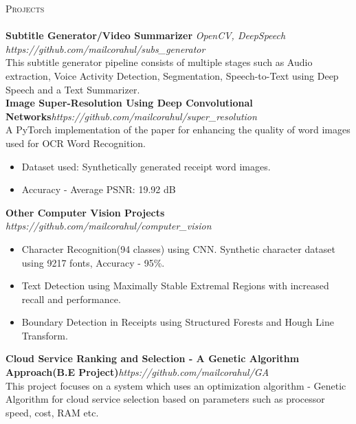 \documentclass[a4paper]{article}
\newcommand{\lineunder} {
    \vspace*{-8pt} \\
    \hspace*{-18pt} \hrulefill \\
}
\newcommand{\header} [1] {
    {\hspace*{-18pt}\vspace*{6pt} \textsc{#1}}
    \vspace*{-6pt} \lineunder
}
\begin{document}
\header{Projects}
{\textbf{Subtitle Generator/Video Summarizer}} {\sl OpenCV, DeepSpeech} \hfill \textit{https://github.com/mailcorahul/subs\_generator}\\
This subtitle generator pipeline consists of multiple stages such as Audio extraction, Voice Activity Detection, Segmentation, Speech-to-Text using Deep Speech and a Text Summarizer.\\
\vspace*{2mm}
{\textbf{Image Super-Resolution Using Deep Convolutional Networks}}\hfill \textit{https://github.com/mailcorahul/super\_resolution}\\
A PyTorch implementation of the paper for enhancing the quality of word images used for OCR Word Recognition.\\
    \begin{itemize}
        \itemsep-0.5em
        \item Dataset used: Synthetically generated receipt word images.
        \item Accuracy - Average PSNR: 19.92 dB
    \end{itemize}

\vspace*{2mm}
{\textbf{Other Computer Vision Projects}} \\ \textit{https://github.com/mailcorahul/computer\_vision}\\

    \begin{itemize}
        \itemsep-0.5em
        \item Character Recognition(94 classes) using CNN. Synthetic character dataset using 9217 fonts, Accuracy - 95\%.
        \item Text Detection using Maximally Stable Extremal Regions with increased recall and performance.
        \item Boundary Detection in Receipts using Structured Forests and Hough Line Transform.\\
    \end{itemize}
\vspace*{2mm}
{\textbf{Cloud Service Ranking and Selection - A Genetic Algorithm Approach(B.E Project)}}\hfill \textit{https://github.com/mailcorahul/GA}\\
This project focuses on a system which uses an optimization algorithm - Genetic Algorithm for cloud service selection based on parameters such as processor speed, cost, RAM etc.\\
\vspace*{2mm}
\end{document}
